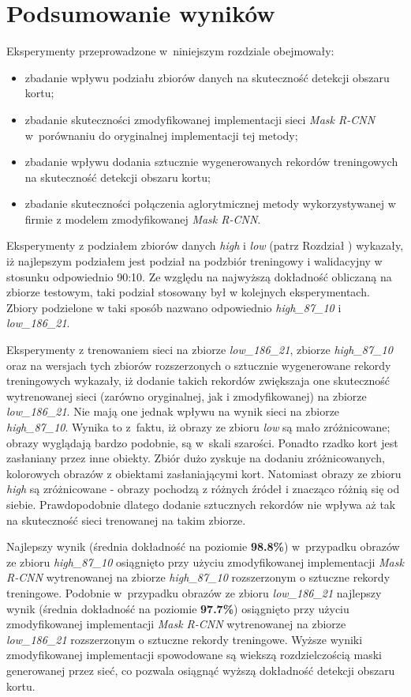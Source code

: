 \section{Podsumowanie wyników}

Eksperymenty przeprowadzone w~niniejszym rozdziale obejmowały:
\begin{itemize}
 \item zbadanie wpływu podziału zbiorów danych na skuteczność detekcji obszaru kortu;
 \item zbadanie skuteczności zmodyfikowanej implementacji sieci \textit{Mask R-CNN} w~porównaniu do oryginalnej implementacji tej metody;
 \item zbadanie wpływu dodania sztucznie wygenerowanych rekordów treningowych na skuteczność detekcji obszaru kortu;
 \item zbadanie skuteczności połączenia aglorytmicznej metody wykorzystywanej w firmie \blue{} z modelem zmodyfikowanej \textit{Mask R-CNN}.
\end{itemize}

Eksperymenty z podziałem zbiorów danych \textit{high} i \textit{low} (patrz Rozdział ) wykazały, iż najlepszym podziałem jest podział na podzbiór treningowy i walidacyjny w stosunku odpowiednio 90:10. Ze względu na najwyższą dokładność obliczaną na zbiorze testowym, taki podział stosowany był w kolejnych eksperymentach. Zbiory podzielone w taki sposób nazwano odpowiednio \textit{high\_87\_10} i \textit{low\_186\_21}.

Eksperymenty z trenowaniem sieci na zbiorze \textit{low\_186\_21}, zbiorze \textit{high\_87\_10} oraz na wersjach tych zbiorów rozszerzonych o sztucznie wygenerowane rekordy treningowych wykazały, iż dodanie takich rekordów zwiększaja one skuteczność wytrenowanej sieci (zarówno oryginalnej, jak i zmodyfikowanej) na zbiorze \textit{low\_186\_21}. Nie mają one jednak wpływu na wynik sieci na zbiorze \textit{high\_87\_10}. Wynika to z~faktu, iż obrazy ze zbioru \textit{low} są mało zróżnicowane; obrazy wyglądają bardzo podobnie, są w~skali szarości. Ponadto rzadko kort jest zasłaniany przez inne obiekty. Zbiór dużo zyskuje na dodaniu zróżnicowanych, kolorowych obrazów z obiektami zasłaniającymi kort. Natomiast obrazy ze zbioru \textit{high} są zróżnicowane - obrazy pochodzą z różnych źródeł i znacząco różnią się od siebie. Prawdopodobnie dlatego dodanie sztucznych rekordów nie wpływa aż tak na skuteczność sieci trenowanej na takim zbiorze.


Najlepszy wynik (średnia dokładność na poziomie \textbf{98.8\%}) w~przypadku obrazów ze zbioru \textit{high\_87\_10} osiągnięto przy użyciu zmodyfikowanej implementacji \textit{Mask R-CNN} wytrenowanej na zbiorze \textit{high\_87\_10} rozszerzonym o sztuczne rekordy treningowe. Podobnie w~przypadku obrazów ze zbioru \textit{low\_186\_21} najlepszy wynik (średnia dokładność na poziomie \textbf{97.7\%}) osiągnięto przy użyciu zmodyfikowanej implementacji \textit{Mask R-CNN} wytrenowanej na zbiorze \textit{low\_186\_21} rozszerzonym o sztuczne rekordy treningowe. Wyższe wyniki zmodyfikowanej implementacji spowodowane są wiekszą rozdzielczością maski generowanej przez sieć, co pozwala osiągnąć wyższą dokładność detekcji obszaru kortu.


